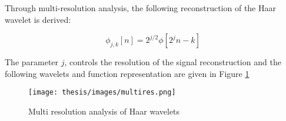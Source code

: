 Through multi-resolution analysis, the following reconstruction of the Haar wavelet is derived:

\begin{equation}
   \phi_{j,k}[n]=2^{j/2}\phi[2^jn-k]
    \label{app1_04_mres}
\end{equation}

The parameter $j$, controls the resolution of the signal reconstruction and the following wavelets and function representation are given in Figure \ref{multires}

\begin{figure}
\centering
  \texttt{[image: thesis/images/multires.png]}\\
  \caption{Multi resolution analysis of Haar wavelets} \label{multires}
\end{figure}
